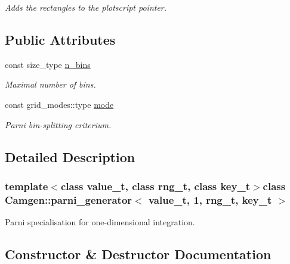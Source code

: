 \begin{DoxyCompactItemize}
\begin{DoxyCompactList}\small\item\em Adds the rectangles to the plotscript pointer. \end{DoxyCompactList}\end{DoxyCompactItemize}
\subsection*{Public Attributes}
\begin{DoxyCompactItemize}
\item 
\hypertarget{a00394_ae1d28ea0e0dd5110edcdc861ab8b963d}{}const size\+\_\+type \hyperlink{a00394_ae1d28ea0e0dd5110edcdc861ab8b963d}{n\+\_\+bins}\label{a00394_ae1d28ea0e0dd5110edcdc861ab8b963d}

\begin{DoxyCompactList}\small\item\em Maximal number of bins. \end{DoxyCompactList}\item 
\hypertarget{a00394_a31a3dc815eb9d4d57f617a3aef66c9d6}{}const grid\+\_\+modes\+::type \hyperlink{a00394_a31a3dc815eb9d4d57f617a3aef66c9d6}{mode}\label{a00394_a31a3dc815eb9d4d57f617a3aef66c9d6}

\begin{DoxyCompactList}\small\item\em Parni bin-\/splitting criterium. \end{DoxyCompactList}\end{DoxyCompactItemize}


\subsection{Detailed Description}
\subsubsection*{template$<$class value\+\_\+t, class rng\+\_\+t, class key\+\_\+t$>$class Camgen\+::parni\+\_\+generator$<$ value\+\_\+t, 1, rng\+\_\+t, key\+\_\+t $>$}

Parni specialisation for one-\/dimensional integration. 

\subsection{Constructor \& Destructor Documentation}
\hypertarget{a00394_acda2cc3d9d1d7ea5d8d5f4716e425d16}{}
